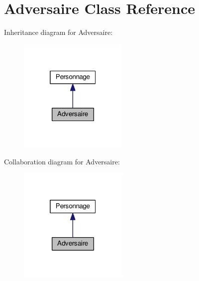 \hypertarget{class_adversaire}{}\section{Adversaire Class Reference}
\label{class_adversaire}


Inheritance diagram for Adversaire\+:
\nopagebreak
\begin{figure}[H]
\begin{center}
\leavevmode
\includegraphics[width=148pt]{class_adversaire__inherit__graph}
\end{center}
\end{figure}


Collaboration diagram for Adversaire\+:
\nopagebreak
\begin{figure}[H]
\begin{center}
\leavevmode
\includegraphics[width=148pt]{class_adversaire__coll__graph}
\end{center}
\end{figure}
